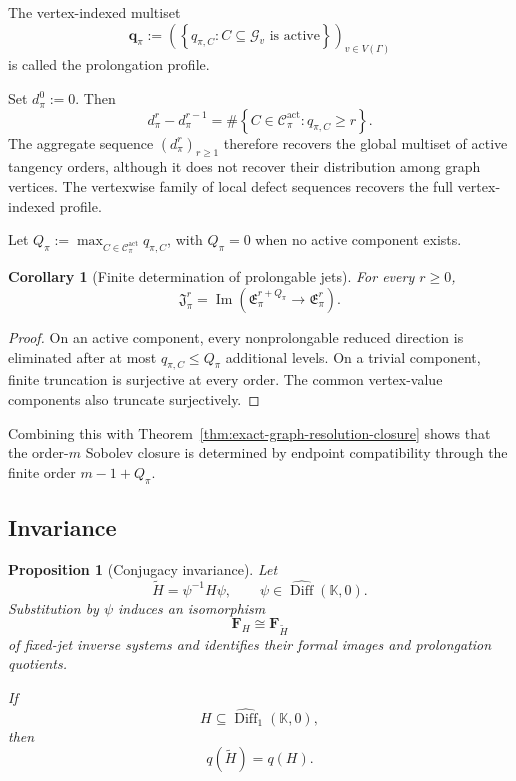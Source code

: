 \documentclass[11pt]{article}
\theoremstyle{plain}
\newtheorem{proposition}[theorem]{Proposition}
\newtheorem{corollary}[theorem]{Corollary}
\theoremstyle{definition}
\begin{document}
The vertex-indexed multiset
\[
  \mathbf q_\pi
  :=
  \left(
    \left\{
      q_{\pi,C}:
      C\subseteq\mathcal G_v
      \text{ is active}
    \right\}
  \right)_{v\in V(\Gamma)}
\]
is called the prolongation profile.

Set
\(d_\pi^0:=0\).
Then
\[
  \boxed{
  d_\pi^r-d_\pi^{r-1}
  =
  \#\left\{
    C\in\mathscr C_\pi^{\mathrm{act}}:
    q_{\pi,C}\geq r
  \right\}.
  }
\]
The aggregate sequence \((d_\pi^r)_{r\geq1}\) therefore recovers the global multiset of active tangency orders, although it
does not recover their distribution among graph vertices. The
vertexwise family of local defect sequences recovers the full
vertex-indexed profile.

Let
\(Q_\pi := \max_{ C\in\mathscr C_\pi^{\mathrm{act}} } q_{\pi,C}\),
with \(Q_\pi=0\) when no active component exists.

\begin{corollary}[Finite determination of prolongable jets]
\label{cor:finite-determination-prolongable-jets}
For every \(r\geq0\),
\[
  \boxed{
  \mathfrak J_\pi^r
  =
  \operatorname{Im}
  \left(
    \mathfrak E_\pi^{r+Q_\pi}
    \longrightarrow
    \mathfrak E_\pi^r
  \right).
  }
\]
\end{corollary}

\begin{proof}
On an active component, every nonprolongable reduced direction is
eliminated after at most \(q_{\pi,C}\leq Q_\pi\) additional levels. On a trivial component, finite truncation is
surjective at every order. The common vertex-value components also
truncate surjectively.
\end{proof}

Combining this with
Theorem~\ref{thm:exact-graph-resolution-closure}
shows that the order-\(m\) Sobolev closure is determined by endpoint
compatibility through the finite order
\(m-1+Q_\pi\).

\subsection{Invariance}
\label{subsec:holonomy-invariance}

\begin{proposition}[Conjugacy invariance]
\label{prop:formal-conjugacy-invariance}
Let
\[
  \widetilde H
  =
  \psi^{-1}H\psi,
  \qquad
  \psi
  \in
  \widehat{\operatorname{Diff}}(\mathbb K,0).
\]
Substitution by \(\psi\) induces an isomorphism
\[
  \mathbf F_H
  \cong
  \mathbf F_{\widetilde H}
\]
of fixed-jet inverse systems and identifies their formal images and
prolongation quotients.

If
\[
  H
  \subseteq
  \widehat{\operatorname{Diff}}_1(\mathbb K,0),
\]
then
\[
  q(\widetilde H)=q(H).
\]
\end{proposition}
\end{document}
